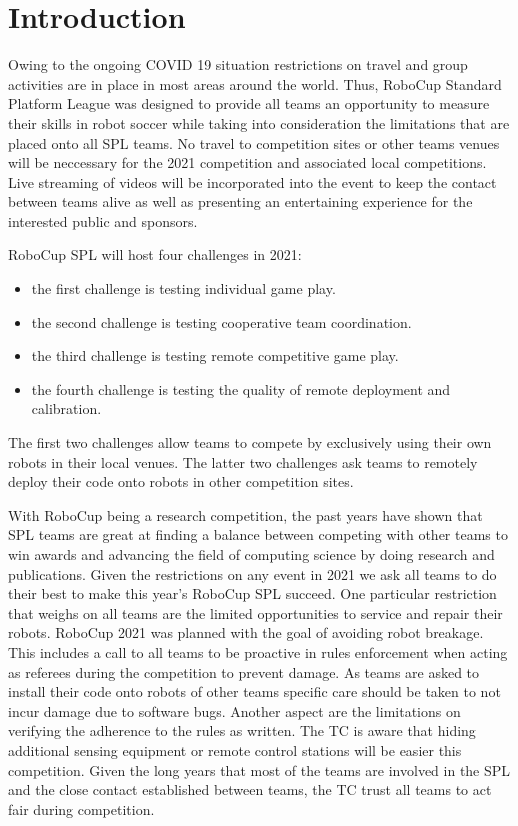 \section{Introduction}

Owing to the ongoing COVID 19 situation restrictions on travel and group activities are in place in most areas around the world. Thus, RoboCup Standard Platform League was designed to provide all teams an opportunity to measure their skills in robot soccer while taking into consideration the limitations that are placed onto all SPL teams. No travel to competition sites or other teams venues will be neccessary for the 2021 competition and associated local competitions. Live streaming of videos will be incorporated into the event to keep the contact between teams alive as well as presenting an entertaining experience for the interested public and sponsors.

RoboCup SPL will host four challenges in 2021:

\begin{itemize}
    \item the first challenge is testing individual game play. 
    \item the second challenge is testing cooperative team coordination.
    \item the third challenge is testing remote competitive game play. 
    \item the fourth challenge is testing the quality of remote deployment and calibration.
\end{itemize}

The first two challenges allow teams to compete by exclusively using their own robots in their local venues. The latter two challenges ask teams to remotely deploy their code onto robots in other competition sites.

With RoboCup being a research competition, the past years have shown that SPL teams are great at finding a balance between competing with other teams to win awards and advancing the field of computing science by doing research and publications. Given the restrictions on any event in 2021 we ask all teams to do their best to make this year's RoboCup SPL succeed. One particular restriction that weighs on all teams are the limited opportunities to service and repair their robots. RoboCup 2021 was planned with the goal of avoiding robot breakage. This includes a call to all teams to be proactive in rules enforcement when acting as referees during the competition to prevent damage. As teams are asked to install their code onto robots of other teams specific care should be taken to not incur damage due to software bugs. Another aspect are the limitations on verifying the adherence to the rules as written. The TC is aware that hiding additional sensing equipment or remote control stations will be easier this competition. Given the long years that most of the teams are involved in the SPL and the close contact established between teams, the TC trust all teams to act fair during competition.

